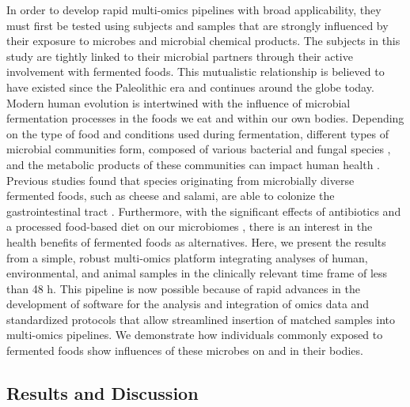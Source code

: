 In order to develop rapid multi-omics pipelines with broad applicability, they must
first be tested using subjects and samples that are strongly influenced by their
exposure to microbes and microbial chemical products. The subjects in this study
are tightly linked to their microbial partners through their active involvement
with fermented foods. This mutualistic relationship is believed to have existed since
the Paleolithic era \cite{McGovern2003} and continues around the globe today. Modern
human evolution is intertwined with the influence of microbial fermentation processes
in the foods we eat and within our own bodies. Depending on the type of food and
conditions used during fermentation, different types of microbial communities form,
composed of various bacterial and fungal species \cite{Wolfe2015}, and the metabolic
products of these communities can impact human health \cite{VanHylckamaVlieg2011}.
Previous studies found that species originating from microbially diverse fermented foods,
such as cheese and salami, are able to colonize the gastrointestinal tract \cite{VanHylckamaVlieg2011}.
Furthermore, with the significant effects of antibiotics and a processed food-based
diet on our microbiomes \cite{Maurice2013,David2014,Turnbaugh2009}, there is an interest
in the health benefits of fermented foods as alternatives. Here, we present the
results from a simple, robust multi-omics platform integrating analyses of human,
environmental, and animal samples in the clinically relevant time frame of less than
48 h. This pipeline is now possible because of rapid advances in the development
of software for the analysis and integration of omics data and standardized protocols
that allow streamlined insertion of matched samples into multi-omics pipelines. We
demonstrate how individuals commonly exposed to fermented foods show influences of
these microbes on and in their bodies.

\subsection{Results and Discussion}

